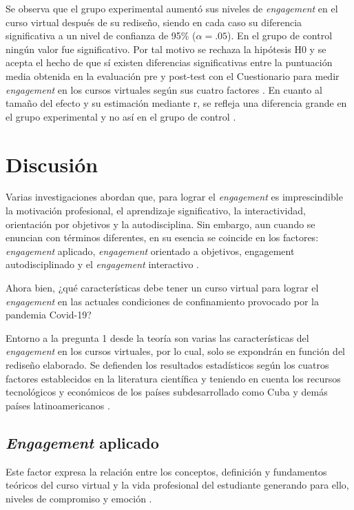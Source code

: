 \documentclass[spanish]{textolivre}
\begin{document}
Se observa que el grupo experimental aumentó sus niveles de \emph{engagement} en el curso virtual después de su rediseño, siendo en cada caso su diferencia significativa a un nivel de confianza de 95\% ($\alpha = .05$). En el grupo de control ningún valor fue significativo. Por tal motivo se rechaza la hipótesis H0 y se acepta el hecho de que sí existen diferencias significativas entre la puntuación media obtenida en la evaluación pre y post-test con el Cuestionario para medir \emph{engagement} en los cursos virtuales según sus cuatro factores \cite{mohd2020}. %
En cuanto al tamaño del efecto y su estimación mediante r, se refleja una diferencia grande en el grupo experimental y no así en el grupo de control \cite{cohen1988}. %

\section{Discusión}
Varias investigaciones \cite{bakker2018, mohd2020, sim2021} %
abordan que, para lograr el \emph{engagement} es imprescindible la motivación profesional, el aprendizaje significativo, la interactividad, orientación por objetivos y la autodisciplina. Sin embargo, aun cuando se enuncian con términos diferentes, en su esencia se coincide en los factores: \emph{engagement} aplicado, \emph{engagement} orientado a objetivos, engagement autodisciplinado y el \emph{engagement} interactivo \cite{handelsman2005, mohd2020}. %

Ahora bien, ¿qué características debe tener un curso virtual para lograr el \emph{engagement} en las actuales condiciones de confinamiento provocado por la pandemia Covid-19?

Entorno a la pregunta 1 desde la teoría \cite{mohd2020} %
son varias las características del \emph{engagement} en los cursos virtuales, por lo cual, solo se expondrán en función del rediseño elaborado. Se defienden los resultados estadísticos según los cuatros factores establecidos en la literatura científica y teniendo en cuenta los recursos tecnológicos y económicos de los países subdesarrollado como Cuba y demás países latinoamericanos \cite{murillo2020}. %

\subsection{\emph{Engagement} aplicado}
Este factor expresa la relación entre los conceptos, definición y fundamentos teóricos del curso virtual y la vida profesional del estudiante generando para ello, niveles de compromiso y emoción \cite{handelsman2005, shumow2013}. %
\end{document}
